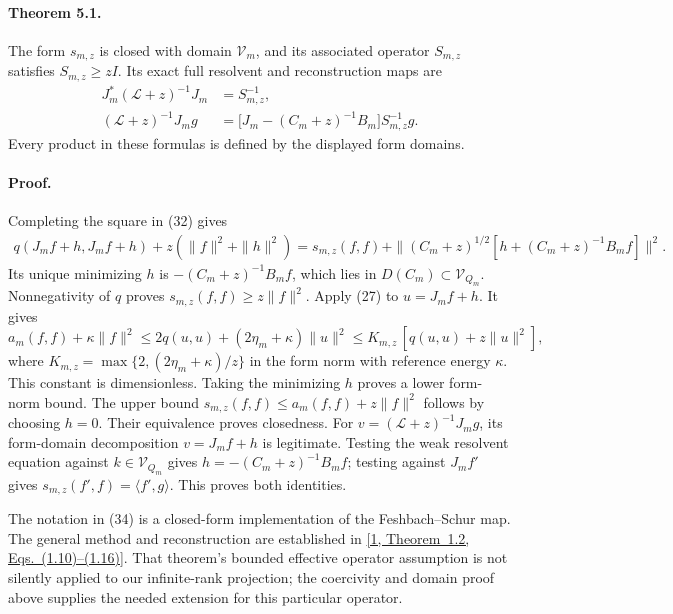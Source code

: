 \documentclass[11pt]{article}
\newcommand{\LL}{\mathscr L}
\newcommand{\VV}{\mathscr V}
\begin{document}
\paragraph{Theorem 5.1.}
The form $s_{m,z}$ is closed with domain $\VV_m$, and its associated
operator $S_{m,z}$ satisfies $S_{m,z}\geq zI$. Its exact full resolvent
and reconstruction maps are
\begin{align}
 J_m^*(\LL+z)^{-1}J_m&=S_{m,z}^{-1},\label{eq:resolvent}\\
 (\LL+z)^{-1}J_mg
 &=\bigl[J_m-(C_m+z)^{-1}B_m\bigr]S_{m,z}^{-1}g.\label{eq:reconstruction}
\end{align}
Every product in these formulas is defined by the displayed form domains.

\paragraph{Proof.}
Completing the square in (32) gives
\begin{align}\label{eq:square}
 q(J_mf+h,J_mf+h)+z(\|f\|^2+\|h\|^2)
 =s_{m,z}(f,f)+\|(C_m+z)^{1/2}[h+(C_m+z)^{-1}B_mf]\|^2.
\end{align}
Its unique minimizing $h$ is $-(C_m+z)^{-1}B_mf$, which lies in
$D(C_m)\subset\VV_{Q_m}$. Nonnegativity of $q$ proves
$s_{m,z}(f,f)\geq z\|f\|^2$. Apply (27) to
$u=J_mf+h$. It gives
\[
 a_m(f,f)+\kappa\|f\|^2\leq2q(u,u)+(2\eta_m+\kappa)\|u\|^2
 \leq K_{m,z}\,[q(u,u)+z\|u\|^2],
\]
where $K_{m,z}=\max\{2,(2\eta_m+\kappa)/z\}$ in the form norm with
reference energy $\kappa$. This constant is dimensionless.
Taking the minimizing $h$ proves a lower form-norm bound. The upper
bound $s_{m,z}(f,f)\leq a_m(f,f)+z\|f\|^2$ follows by choosing $h=0$.
Their equivalence proves closedness. For $v=(\LL+z)^{-1}J_mg$, its
form-domain decomposition $v=J_mf+h$ is legitimate. Testing the weak
resolvent equation against $k\in\VV_{Q_m}$ gives
$h=-(C_m+z)^{-1}B_mf$; testing against $J_mf'$ gives
$s_{m,z}(f',f)=\langle f',g\rangle$. This proves both identities.



The notation in (34) is a closed-form implementation of the
Feshbach--Schur map. The general method and reconstruction are established
in \href{https://doi.org/10.4171/ECR/18-1/5}{[1, Theorem~1.2, Eqs.~(1.10)--(1.16)]}. That theorem's bounded
effective operator assumption is not silently applied to our infinite-rank
projection; the coercivity and domain proof above supplies the needed
extension for this particular operator.
\end{document}

